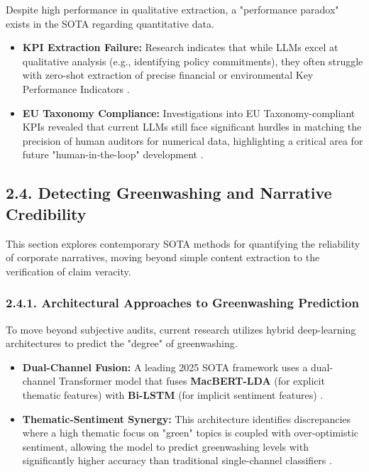 \documentclass{article}
\begin{document}
Despite high performance in qualitative extraction, a "performance paradox" exists in the SOTA regarding quantitative data.
\begin{itemize}
\item 

\textbf{KPI Extraction Failure:} Research indicates that while LLMs excel at qualitative analysis (e.g., identifying policy commitments), they often struggle with zero-shot extraction of precise financial or environmental Key Performance Indicators  \parencite{jonathan_schmoll_931ab217}.\item 

\textbf{EU Taxonomy Compliance:} Investigations into EU Taxonomy-compliant KPIs revealed that current LLMs still face significant hurdles in matching the precision of human auditors for numerical data, highlighting a critical area for future "human-in-the-loop" development  \parencite{jonathan_schmoll_931ab217}.
\end{itemize}
\subsection*{2.4. Detecting Greenwashing and Narrative Credibility}

This section explores contemporary SOTA methods for quantifying the reliability of corporate narratives, moving beyond simple content extraction to the verification of claim veracity.
\subsubsection*{2.4.1. Architectural Approaches to Greenwashing Prediction}

To move beyond subjective audits, current research utilizes hybrid deep-learning architectures to predict the "degree" of greenwashing.
\begin{itemize}
\item 

\textbf{Dual-Channel Fusion:} A leading 2025 SOTA framework uses a dual-channel Transformer model that fuses \textbf{MacBERT-LDA} (for explicit thematic features) with \textbf{Bi-LSTM} (for implicit sentiment features)  \parencite{xiaojia_wang_02351a60}.\item 

\textbf{Thematic-Sentiment Synergy:} This architecture identifies discrepancies where a high thematic focus on "green" topics is coupled with over-optimistic sentiment, allowing the model to predict greenwashing levels with significantly higher accuracy than traditional single-channel classifiers  \parencite{xiaojia_wang_02351a60}.
\end{itemize}
\end{document}
